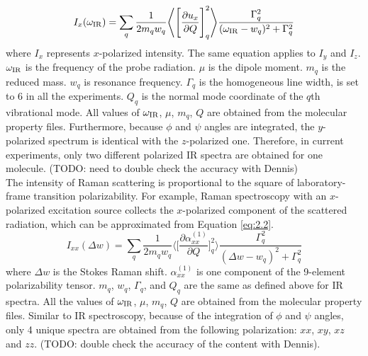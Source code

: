 \begin{equation} \label{eq:2.1}
I_x(\omega_{\rm IR}) = \sum_{q} \frac{1}{2 m_{q} w_{q}} \Bigg \langle \Bigg\lbrack \frac{\partial u_x}{\partial Q} \Bigg\rbrack_{q} ^2 \Bigg\rangle \frac{\Gamma_q^2}{(\omega_{\rm IR}-w_q)^2 + \Gamma_q^2}
\end{equation} 
where $I_x$ represents $x$-polarized intensity. The same equation applies to $I_y$ and $I_z$. $\omega_{\rm IR}$ is the frequency of the probe radiation. $\mu$ is the dipole moment. $m_q$ is the reduced mass. $w_q$ is resonance frequency. $\Gamma_q$ is the homogeneous line width, is set to 6 in all the experiments. $Q_q$ is the normal mode coordinate of the $q$th vibrational mode. All values of $\omega_{\rm IR}$, $\mu$, $m_q$, $Q$ are obtained from the molecular property files. Furthermore, because $\phi$ and $\psi$ angles are integrated, the $y$-polarized spectrum is identical with the $z$-polarized one. Therefore, in current experiments, only two different polarized IR spectra are obtained for one molecule. (TODO: need to double check the accuracy with Dennis)\\



The intensity of Raman scattering is proportional to the square of laboratory-frame transition polarizability. For example, Raman spectroscopy with an $x$-polarized excitation source collects the $x$-polarized component of the scattered radiation, which can be approximated from Equation \ref{eq:2.2}. \\

\begin{equation} \label{eq:2.2}
I_{xx}(\Delta w) = \sum_{q} \frac{1}{2 m_{q} w_{q}} \Bigg \langle \Bigg\lbrack \frac{\partial \alpha_{xx}^{(1)}}{\partial Q} \Bigg\rbrack_{q} ^2 \Bigg\rangle \frac{\Gamma_q^2}{(\Delta w-w_q)^2 + \Gamma_q^2}
\end{equation} 
where $\Delta w$ is the Stokes Raman shift. $\alpha_{xx}^{(1)}$ is one component of the 9-element polarizability tensor. $m_q$, $w_q$, $\Gamma_q$, and $Q_q$ are the same as defined above for IR spectra. All the values of $\omega_{\rm IR}$, $\mu$, $m_q$, $Q$ are obtained from the molecular property files. Similar to IR spectroscopy, because of the integration of $\phi$ and $\psi$ angles, only 4 unique spectra are obtained from the following polarization: $xx$, $xy$, $xz$ and $zz$.  (TODO: double check the accuracy of the content with Dennis). \\

